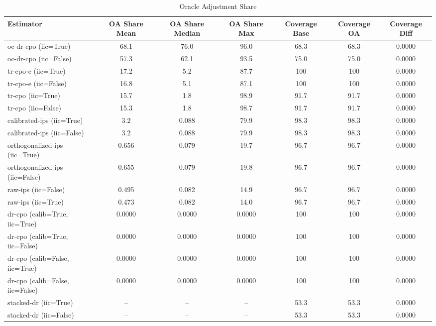 \begin{table}[htbp]
\centering
\caption{Oracle Adjustment Share}
\label{tab:A4}
\begin{tabular}{l|cccccc}
\toprule
Estimator & OA Share Mean & OA Share Median & OA Share Max & Coverage Base & Coverage OA & Coverage Diff \\
\midrule
oc-dr-cpo (iic=True) & 68.1 & 76.0 & 96.0 & 68.3 & 68.3 & 0.0000 \\
oc-dr-cpo (iic=False) & 57.3 & 62.1 & 93.5 & 75.0 & 75.0 & 0.0000 \\
tr-cpo-e (iic=True) & 17.2 & 5.2 & 87.7 & 100 & 100 & 0.0000 \\
tr-cpo-e (iic=False) & 16.8 & 5.1 & 87.1 & 100 & 100 & 0.0000 \\
tr-cpo (iic=True) & 15.7 & 1.8 & 98.9 & 91.7 & 91.7 & 0.0000 \\
tr-cpo (iic=False) & 15.3 & 1.8 & 98.7 & 91.7 & 91.7 & 0.0000 \\
calibrated-ips (iic=True) & 3.2 & 0.088 & 79.9 & 98.3 & 98.3 & 0.0000 \\
calibrated-ips (iic=False) & 3.2 & 0.088 & 79.9 & 98.3 & 98.3 & 0.0000 \\
orthogonalized-ips (iic=True) & 0.656 & 0.079 & 19.7 & 96.7 & 96.7 & 0.0000 \\
orthogonalized-ips (iic=False) & 0.655 & 0.079 & 19.8 & 96.7 & 96.7 & 0.0000 \\
raw-ips (iic=False) & 0.495 & 0.082 & 14.9 & 96.7 & 96.7 & 0.0000 \\
raw-ips (iic=True) & 0.473 & 0.082 & 14.0 & 96.7 & 96.7 & 0.0000 \\
dr-cpo (calib=True, iic=True) & 0.0000 & 0.0000 & 0.0000 & 100 & 100 & 0.0000 \\
dr-cpo (calib=True, iic=False) & 0.0000 & 0.0000 & 0.0000 & 100 & 100 & 0.0000 \\
dr-cpo (calib=False, iic=True) & 0.0000 & 0.0000 & 0.0000 & 100 & 100 & 0.0000 \\
dr-cpo (calib=False, iic=False) & 0.0000 & 0.0000 & 0.0000 & 100 & 100 & 0.0000 \\
stacked-dr (iic=True) & -- & -- & -- & 53.3 & 53.3 & 0.0000 \\
stacked-dr (iic=False) & -- & -- & -- & 53.3 & 53.3 & 0.0000 \\
\bottomrule
\end{tabular}
\end{table}
